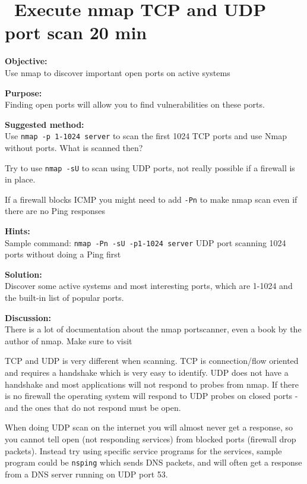 \documentclass[a4paper,11pt,notitlepage]{report}
\begin{document}
\chapter{\faExclamationTriangle\ Execute nmap TCP and UDP port scan 20 min}
\label{ex:nmap-synscan}


{\bf Objective:} \\
Use nmap to discover important open ports on active systems

{\bf Purpose:}\\
Finding open ports will allow you to find vulnerabilities on these ports.

{\bf Suggested method:}\\
Use \verb+nmap -p 1-1024 server+ to scan the first 1024 TCP
ports and use Nmap without ports. What is scanned then?

Try to use \verb+nmap -sU+ to scan using UDP ports, not really possible if a firewall is in place.

If a firewall blocks ICMP you might need to add \verb+-Pn+ to make nmap scan even if there are no Ping responses

{\bf Hints:} \\
Sample command: \verb+nmap -Pn -sU -p1-1024 server+ UDP port scanning
1024 ports without doing a Ping first

{\bf Solution:}\\
Discover some active systems and most interesting ports, which are 1-1024 and the built-in list of popular ports.

{\bf Discussion:}\\
There is a lot of documentation about the nmap portscanner, even a book by the author
of nmap. Make sure to visit 

TCP and UDP is very different when scanning. TCP is connection/flow oriented and requires a handshake which is very easy to identify. UDP does not have a handshake and most applications will not respond to probes from nmap. If there is no firewall the operating system will respond to UDP probes on closed ports - and the ones that do not respond must be open.

When doing UDP scan on the internet you will almost never get a response, so you cannot tell open (not responding services) from blocked ports (firewall drop packets). Instead try using specific service programs for the services, sample program could be \verb+nsping+ which sends DNS packets, and will often get a response from a DNS server running on UDP port 53.
\end{document}
